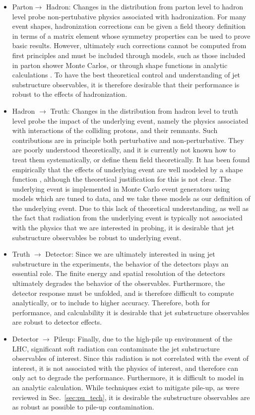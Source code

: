 \documentclass[11pt,letterpaper]{article}
\DeclareRobustCommand{\Sec}[1]{Sec.~\ref{#1}}
\begin{document}
\begin{itemize}
\item Parton$\to$ Hadron: Changes in the distribution from parton level to hadron level probe non-pertubative physics associated with hadronization. For many event shapes, hadronization corrections can be given a field theory definition in terms of a matrix element whose symmetry properties can be used to prove basic results. However, ultimately such corrections cannot be computed from first principles and must be included through models, such as those included in parton shower Monte Carlos, or through shape functions in analytic calculations \cite{Korchemsky:1999kt,Korchemsky:2000kp,Bosch:2004th,Hoang:2007vb,Ligeti:2008ac}.  To have the best theoretical control and understanding of jet substructure observables, it is therefore desirable that their performance is robust to the effects of hadronization.
\item Hadron $\to$ Truth: Changes in the distribution from hadron level to truth level probe the impact of the underlying event, namely the physics associated with interactions of the colliding protons, and their remnants. Such contributions are in principle both perturbative and non-perturbative. They are poorly understood theoretically, and it is currently not known how to treat them systematically, or define them field theoretically. It has been found empirically that the effects of underlying event are well modeled by a shape function \cite{Stewart:2014nna}, although the theoretical justification for this is not clear.  The underlying event is implemented in Monte Carlo event generators using models which are tuned to data, and we take these models as our definition of the underlying event. Due to this lack of theoretical understanding, as well as the fact that radiation from the underlying event is typically not associated with the physics that we are interested in probing, it is desirable that jet substructure observables be robust to underlying event.
\item Truth $\to$ Detector: Since we are ultimately interested in using jet substructure in the experiments, the behavior of the detectors plays an essential role. The finite energy and spatial resolution of the detectors ultimately degrades the behavior of the observables. Furthermore, the detector response must be unfolded, and is therefore difficult to compute analytically, or to include to higher accuracy. Therefore, both for performance, and calculability it is desirable that jet substructure observables are robust to detector effects.
\item Detector $\to$ Pileup: Finally, due to the high-pile up environment of the LHC, significant soft radiation can contaminate the jet substructure observables of interest. Since this radiation is not correlated with the event of interest, it is not associated with the physics of interest, and therefore can only act to degrade the performance. Furthermore, it is difficult to model in an analytic calculation. While techniques exist to mitigate pile-up, as were reviewed in \Sec{sec:pu_tech}, it is desirable the substructure observables are as robust as possible to pile-up contamination.
\end{itemize}
\end{document}
